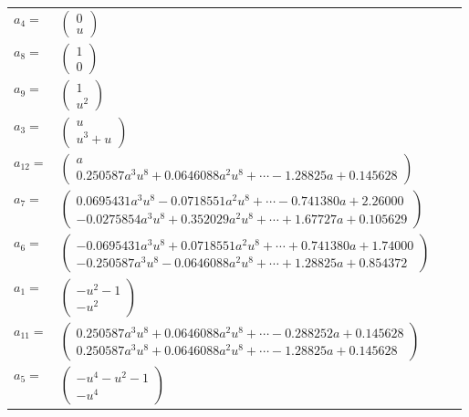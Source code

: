 \documentclass[1p]{elsarticle_modified}
\theoremstyle{definition}
\begin{document}
\begin{tabular}{m{7pt} m{180pt} m{7pt} m{180pt} }
\flushright $a_{4}=$&$\begin{pmatrix}0\\u\end{pmatrix}$ \\
\flushright $a_{8}=$&$\begin{pmatrix}1\\0\end{pmatrix}$ \\
\flushright $a_{9}=$&$\begin{pmatrix}1\\u^2\end{pmatrix}$ \\
\flushright $a_{3}=$&$\begin{pmatrix}u\\u^3+u\end{pmatrix}$ \\
\flushright $a_{12}=$&$\begin{pmatrix}a\\0.250587 a^{3} u^{8}+0.0646088 a^{2} u^{8}+\cdots-1.28825 a+0.145628\end{pmatrix}$ \\
\flushright $a_{7}=$&$\begin{pmatrix}0.0695431 a^{3} u^{8}-0.0718551 a^{2} u^{8}+\cdots-0.741380 a+2.26000\\-0.0275854 a^{3} u^{8}+0.352029 a^{2} u^{8}+\cdots+1.67727 a+0.105629\end{pmatrix}$ \\
\flushright $a_{6}=$&$\begin{pmatrix}-0.0695431 a^{3} u^{8}+0.0718551 a^{2} u^{8}+\cdots+0.741380 a+1.74000\\-0.250587 a^{3} u^{8}-0.0646088 a^{2} u^{8}+\cdots+1.28825 a+0.854372\end{pmatrix}$ \\
\flushright $a_{1}=$&$\begin{pmatrix}- u^2-1\\- u^2\end{pmatrix}$ \\
\flushright $a_{11}=$&$\begin{pmatrix}0.250587 a^{3} u^{8}+0.0646088 a^{2} u^{8}+\cdots-0.288252 a+0.145628\\0.250587 a^{3} u^{8}+0.0646088 a^{2} u^{8}+\cdots-1.28825 a+0.145628\end{pmatrix}$ \\
\flushright $a_{5}=$&$\begin{pmatrix}- u^4- u^2-1\\- u^4\end{pmatrix}$ \\

\end{tabular}
\end{document}

